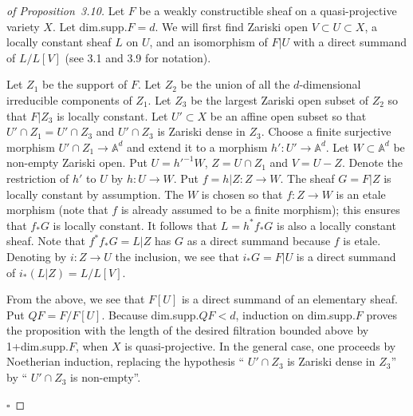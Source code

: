 \documentclass[10pt,twoside]{article}
\newcommand{\A}{{\mathbb {A}}}
\newcommand{\qed}{\nopagebreak\par\hspace*{\fill}$\square$\par\vskip2mm}
\newtheorem{proof}{Proof}
\begin{document}
\begin{proof}[of Proposition~3.10]
Let $F$ be a weakly constructible sheaf 
on a quasi-projective variety $X$. Let dim.supp.$F=d$.
We will first find  Zariski open 
$V \subset U\subset X$, a locally constant sheaf $L$
 on $U$, and an isomorphism of $F|U$ with a direct summand of 
$L/L[V]$  (see 3.1 and 3.9 for notation).  

Let $Z_1$ be the support of
$F$. Let $Z_2$ be the union of all the $d$-dimensional
irreducible components of $Z_1$.
 Let $Z_3$  
be the largest Zariski open subset of $Z_2$
 so that $F|Z_3$ is locally constant. Let $U' \subset X$
be an affine open subset so that 
$U'\cap Z_1 = U' \cap Z_3$ and $U' \cap Z_3$ is Zariski
dense in $Z_3$. Choose a 
finite surjective morphism $ U'\cap Z_1 \to \A^d$ and extend
 it to a morphism $h':U' \to \A^d$. Let $W \subset \A^d$
 be non-empty Zariski open. Put $U={h'}^{-1}W$, $Z=U \cap Z_1$ 
and $V=U-Z$. Denote the restriction of $h'$ to $U$ 
 by $h:U \to W$. Put $f=h|Z:Z \to W$. 
 The sheaf $G=F|Z$ is locally constant by assumption.
The $W$ is chosen so that 
$f:Z \to W$ is an etale morphism (note that $f$ 
is already assumed to be a finite
 morphism); this ensures that $f_*G$
is locally constant. It follows that $L=h^*f_*G$ is
also a locally constant sheaf. Note that $f^*f_*G=L|Z$ has
 $G$ as a direct summand because $f$ is etale.
Denoting by $i:Z \to U$ the inclusion, we see that 
 $i_*G=F|U$ is a direct summand of $i_*(L|Z)=L/L[V]$. 

From the above, we see that $F[U]$ is a direct
summand of an elementary sheaf. Put $QF=F/F[U]$. Because  
dim.supp.$QF<d$, induction on dim.supp.$F$ proves
the proposition with the length of the desired 
filtration bounded
above by 1+dim.supp.$F$, when $X$ is quasi-projective.
In the general case,  one proceeds  by Noetherian induction, 
replacing the hypothesis `` $U' \cap Z_3$ is Zariski
dense in $Z_3$'' by `` $U' \cap Z_3$ is non-empty''.
\qed\end{proof}
\end{document}
